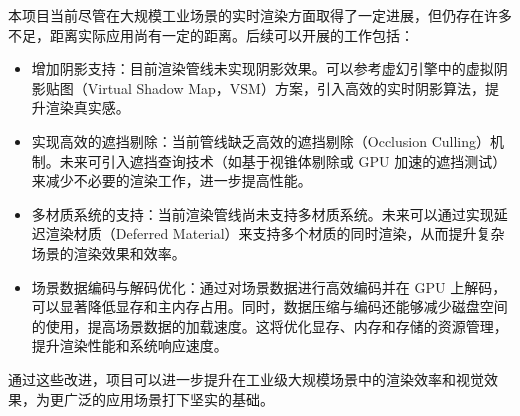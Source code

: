 本项目当前尽管在大规模工业场景的实时渲染方面取得了一定进展，但仍存在许多不足，距离实际应用尚有一定的距离。后续可以开展的工作包括：

\begin{itemize}
    \item 增加阴影支持：目前渲染管线未实现阴影效果。可以参考虚幻引擎中的虚拟阴影贴图（Virtual Shadow Map，VSM）方案，引入高效的实时阴影算法，提升渲染真实感。

    \item 实现高效的遮挡剔除：当前管线缺乏高效的遮挡剔除（Occlusion Culling）机制。未来可引入遮挡查询技术（如基于视锥体剔除或 GPU 加速的遮挡测试）来减少不必要的渲染工作，进一步提高性能。

    \item 多材质系统的支持：当前渲染管线尚未支持多材质系统。未来可以通过实现延迟渲染材质（Deferred Material）来支持多个材质的同时渲染，从而提升复杂场景的渲染效果和效率。

    \item 场景数据编码与解码优化：通过对场景数据进行高效编码并在 GPU 上解码，可以显著降低显存和主内存占用。同时，数据压缩与编码还能够减少磁盘空间的使用，提高场景数据的加载速度。这将优化显存、内存和存储的资源管理，提升渲染性能和系统响应速度。
\end{itemize}

通过这些改进，项目可以进一步提升在工业级大规模场景中的渲染效率和视觉效果，为更广泛的应用场景打下坚实的基础。